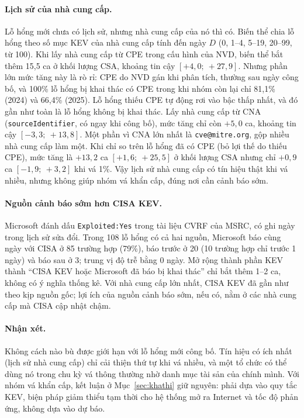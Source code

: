 \paragraph{Lịch sử của nhà cung cấp.} Lỗ hổng mới chưa có lịch sử, nhưng nhà cung cấp của nó thì
có. Biến thể chia lỗ hổng theo số mục KEV của nhà cung cấp tính đến ngày $D$ (0, 1--4, 5--19,
20--99, từ 100). Khi lấy nhà cung cấp từ CPE trong cấu hình của NVD, biến thể bắt thêm 15,5 ca ở
khối lượng CSA, khoảng tin cậy $[+4{,}0;\ +27{,}9]$. Nhưng phần lớn mức tăng này là rò rỉ: CPE do
NVD gán khi phân tích, thường sau ngày công bố, và 100\% lỗ hổng bị khai thác có CPE trong khi
nhóm còn lại chỉ 81,1\% (2024) và 66,4\% (2025). Lỗ hổng thiếu CPE tự động rơi vào bậc thấp nhất,
và đó gần như toàn là lỗ hổng không bị khai thác. Lấy nhà cung cấp từ CNA (\texttt{sourceIdentifier},
có ngay khi công bố), mức tăng chỉ còn $+5{,}0$ ca, khoảng tin cậy $[-3{,}3;\ +13{,}8]$. Một phần vì
CNA lớn nhất là \texttt{cve@mitre.org}, gộp nhiều nhà cung cấp làm một. Khi chỉ so trên lỗ hổng
đã có CPE (bỏ lợi thế do thiếu CPE), mức tăng là $+13{,}2$ ca $[+1{,}6;\ +25{,}5]$ ở khối lượng
CSA nhưng chỉ $+0{,}9$ ca $[-1{,}9;\ +3{,}2]$ khi vá 1\%. Vậy lịch sử nhà cung cấp có tín hiệu thật
khi vá nhiều, nhưng không giúp nhóm vá khẩn cấp, đúng nơi cần cảnh báo sớm.

\paragraph{Nguồn cảnh báo sớm hơn CISA KEV.} Microsoft đánh dấu \texttt{Exploited:Yes} trong
tài liệu CVRF của MSRC, có ghi ngày trong lịch sử sửa đổi. Trong 108 lỗ hổng có cả hai nguồn,
Microsoft báo cùng ngày với CISA ở 85 trường hợp (79\%), báo trước ở 20 (10 trường hợp chỉ trước
1 ngày) và báo sau ở 3; trung vị độ trễ bằng 0 ngày. Mở rộng thành phần KEV thành
``CISA KEV hoặc Microsoft đã báo bị khai thác'' chỉ bắt thêm 1--2 ca, không có ý nghĩa thống kê.
Với nhà cung cấp lớn nhất, CISA KEV đã gần như theo kịp nguồn gốc; lợi ích của nguồn cảnh báo
sớm, nếu có, nằm ở các nhà cung cấp mà CISA cập nhật chậm.

\paragraph{Nhận xét.} Không cách nào bù được giới hạn với lỗ hổng mới công bố. Tín hiệu có ích
nhất (lịch sử nhà cung cấp) chỉ cải thiện thứ tự khi vá nhiều, và một tổ chức có thể dùng nó trong
chu kỳ vá thông thường nhờ danh mục tài sản của chính mình. Với nhóm vá khẩn cấp, kết luận ở
Mục~\ref{sec:khathi} giữ nguyên: phải dựa vào quy tắc KEV, biện pháp giảm thiểu tạm thời cho hệ
thống mở ra Internet và tốc độ phản ứng, không dựa vào dự báo.

